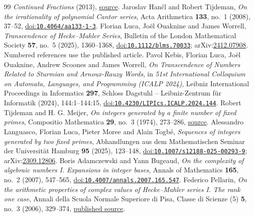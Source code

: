 \begin{thebibliography}{99}
  \emph{Continued Fractions} (2013),
  \href{https://www.math.ru.nl/~bosma/Students/CF.pdf}{source}.
 Jaroslav Han\v{c}l and Robert Tijdeman,
  \emph{On the irrationality of polynomial Cantor series}, Acta Arithmetica \textbf{133}, no.~1 (2008), 37--52,
  \href{https://doi.org/10.4064/aa133-1-3}{doi:\nolinkurl{10.4064/aa133-1-3}}.
 Florian Luca, Jo\"{e}l Ouaknine and James Worrell,
  \emph{Transcendence of Hecke--Mahler Series}, Bulletin of the London Mathematical Society \textbf{57}, no.~5 (2025), 1360--1368,
  \href{https://doi.org/10.1112/blms.70033}{doi:\nolinkurl{10.1112/blms.70033}}; arXiv:\href{https://arxiv.org/abs/2412.07908}{2412.07908}. Numbered references use the published article.
 Pavol Kebis, Florian Luca, Jo\"{e}l Ouaknine, Andrew Scoones and James Worrell,
  \emph{On Transcendence of Numbers Related to Sturmian and Arnoux-Rauzy Words}, in \emph{51st International Colloquium on Automata, Languages, and Programming (ICALP 2024)}, Leibniz International Proceedings in Informatics \textbf{297}, Schloss Dagstuhl -- Leibniz-Zentrum f\"{u}r Informatik (2024), 144:1--144:15,
  \href{https://doi.org/10.4230/LIPIcs.ICALP.2024.144}{doi:\nolinkurl{10.4230/LIPIcs.ICALP.2024.144}}.
 Robert Tijdeman and H. G. Meijer,
  \emph{On integers generated by a finite number of fixed primes}, Compositio Mathematica \textbf{29}, no.~3 (1974), 273--286,
  \href{https://www.numdam.org/article/CM_1974__29_3_273_0.pdf}{source}.
 Alessandro Languasco, Florian Luca, Pieter Moree and Alain Togb\'{e},
  \emph{Sequences of integers generated by two fixed primes}, Abhandlungen aus dem Mathematischen Seminar der Universität Hamburg \textbf{95} (2025), 123--148,
  \href{https://doi.org/10.1007/s12188-025-00293-9}{doi:\nolinkurl{10.1007/s12188-025-00293-9}}; arXiv:\href{https://arxiv.org/abs/2309.12806}{2309.12806}.
 Boris Adamczewski and Yann Bugeaud,
  \emph{On the complexity of algebraic numbers I. Expansions in integer bases},
  Annals of Mathematics \textbf{165}, no.~2 (2007), 547--565,
  \href{https://doi.org/10.4007/annals.2007.165.547}{doi:\nolinkurl{10.4007/annals.2007.165.547}}.
 Federico Pellarin,
  \emph{On the arithmetic properties of complex values of Hecke--Mahler series I.
  The rank one case}, Annali della Scuola Normale Superiore di Pisa,
  Classe di Scienze (5) \textbf{5}, no.~3 (2006), 329--374,
  \href{https://www.numdam.org/item/ASNSP_2006_5_5_3_329_0/}{published source}.

\end{thebibliography}
